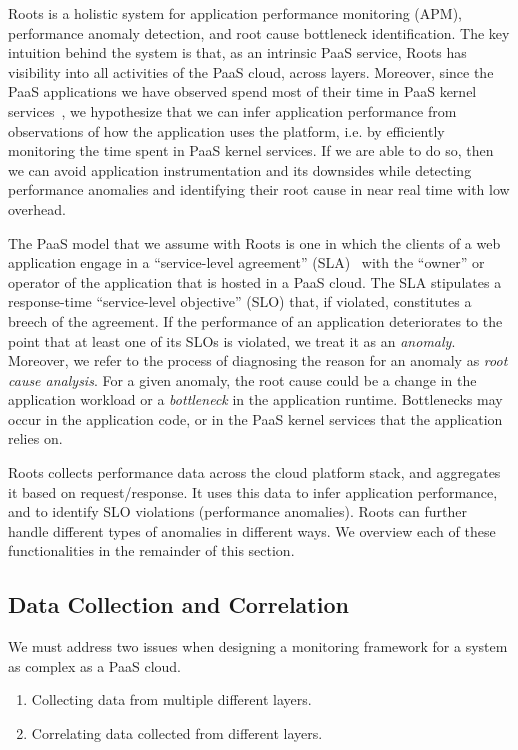 Roots is a holistic system for application performance monitoring (APM), 
performance anomaly detection, and root cause bottleneck identification.
The key intuition behind the system is that, as an intrinsic PaaS service, Roots
has visibility into all activities of the PaaS cloud, across layers.
Moreover, since the PaaS applications we have observed spend most of their time in 
PaaS kernel services~\cite{Jayathilaka:2015:RTS:2806777.2806842}, we hypothesize
that we can infer application performance from observations of how
 the application uses the platform, i.e. by efficiently monitoring the time spent in 
PaaS kernel services. If we are able to do so, then we can avoid application
instrumentation and its downsides while detecting performance anomalies and 
identifying their root cause in near real time with low overhead.

The PaaS model that we assume with Roots is one 
in which the clients of a web application engage in a
``service-level agreement'' (SLA)~\cite{Keller:2003:WFS:635430.635442}
with the ``owner'' or operator of the application that is hosted in a PaaS cloud.  The SLA
stipulates a response-time ``service-level objective'' (SLO) that, if violated, 
constitutes a breech of the agreement.
If the performance of an application deteriorates to the
point that at least one of its SLOs is violated, we treat it 
as an \textit{anomaly}. Moreover, we refer to the process
of diagnosing the reason for 
an anomaly as \textit{root cause analysis}.
For a given anomaly, the root cause could be a change in the application workload or
a \textit{bottleneck} in the application runtime. Bottlenecks may occur in the 
application code, or in the PaaS kernel services that the application relies on.

Roots collects performance data across the cloud platform stack, and aggregates it based on 
request/response.  It uses this data to infer application performance, and to identify
SLO violations (performance anomalies).  Roots can further handle different types of anomalies
in different ways.  We overview each of these functionalities in the remainder of this section.

\subsection{Data Collection and Correlation}

We must address two issues when designing a monitoring framework for
a system as complex as a PaaS cloud.
\begin{enumerate}
\item Collecting data from multiple different layers.
\item Correlating data collected from different layers.
\end{enumerate}

